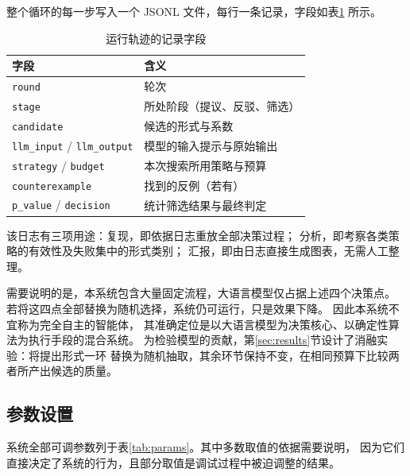 整个循环的每一步写入一个 JSONL 文件，每行一条记录，字段如表\ref{tab:trace} 所示。

\begin{table}[H]
\centering
\small
\caption{运行轨迹的记录字段}
\label{tab:trace}
\begin{tabular}{@{}ll@{}}
\toprule
字段 & 含义 \\
\midrule
\texttt{round} & 轮次 \\
\texttt{stage} & 所处阶段（提议、反驳、筛选） \\
\texttt{candidate} & 候选的形式与系数 \\
\texttt{llm\_input} / \texttt{llm\_output} & 模型的输入提示与原始输出 \\
\texttt{strategy} / \texttt{budget} & 本次搜索所用策略与预算 \\
\texttt{counterexample} & 找到的反例（若有） \\
\texttt{p\_value} / \texttt{decision} & 统计筛选结果与最终判定 \\
\bottomrule
\end{tabular}
\end{table}

该日志有三项用途：复现，即依据日志重放全部决策过程；
分析，即考察各类策略的有效性及失败集中的形式类别；
汇报，即由日志直接生成图表，无需人工整理。

需要说明的是，本系统包含大量固定流程，大语言模型仅占据上述四个决策点。
若将这四点全部替换为随机选择，系统仍可运行，只是效果下降。
因此本系统不宜称为完全自主的智能体，
其准确定位是以大语言模型为决策核心、以确定性算法为执行手段的混合系统。
为检验模型的贡献，第\ref{sec:results}节设计了消融实验：将提出形式一环
替换为随机抽取，其余环节保持不变，在相同预算下比较两者所产出候选的质量。

\subsection{参数设置}

系统全部可调参数列于表\ref{tab:params}。其中多数取值的依据需要说明，
因为它们直接决定了系统的行为，且部分取值是调试过程中被迫调整的结果。

